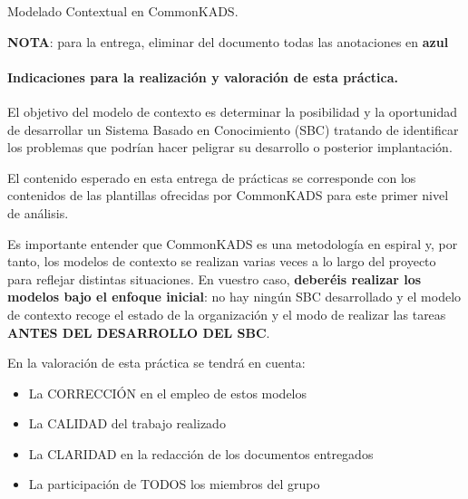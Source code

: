 \documentclass[12pt,a4paper,twoside,spanish]{article}      %
\begin{document}
\pagestyle{myheadings}  {Modelado Contextual en CommonKADS.}

\setlength{\parindent}{1,5cm} \setlength{\parskip}{0,7cm}

{\color{blue} 

\noindent \textbf{NOTA}: para la entrega, eliminar del documento todas las anotaciones en \textbf{azul}

\paragraph{Indicaciones para la realización y valoración de esta práctica.}

El objetivo del modelo de contexto es determinar la posibilidad y la oportunidad de desarrollar un Sistema Basado en Conocimiento (SBC) tratando de identificar los problemas que podrían hacer peligrar su desarrollo o posterior implantación.

El contenido esperado en esta entrega de prácticas se corresponde con los contenidos de las plantillas ofrecidas por CommonKADS para este primer nivel de análisis.


Es importante entender que CommonKADS es una metodología en espiral y, por tanto, los modelos de contexto se realizan varias veces a lo largo del proyecto para reflejar distintas situaciones. En vuestro caso, \textbf{deberéis realizar los modelos bajo el enfoque inicial}: no hay ningún SBC desarrollado y el modelo de contexto recoge el estado de la organización y el modo de realizar las tareas \textbf{ANTES DEL DESARROLLO DEL SBC}. 

En la valoración de esta práctica se tendrá en cuenta:
\begin{itemize}
    \item La CORRECCIÓN en el empleo de estos modelos
    \item La CALIDAD del trabajo realizado
    \item La CLARIDAD en la redacción de los documentos entregados    
    \item   La participación de TODOS los miembros del grupo  
\end{itemize}
}

\cleardoublepage

\end{document}
